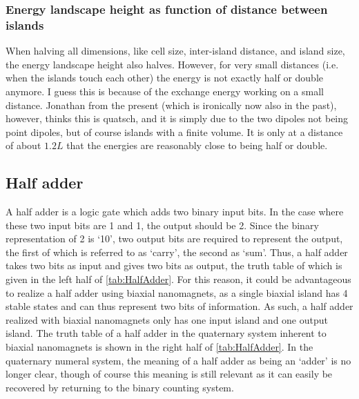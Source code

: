 \documentclass[11pt,a4paper,english]{article}
\begin{document}
\subsubsection{Energy landscape height as function of distance between islands}
\label{par:TwoIslands_EnergyHeight}
When halving all dimensions, like cell size, inter-island distance, and island size, the energy landscape height also halves. However, for very small distances (i.e. when the islands touch each other) the energy is not exactly half or double anymore. I guess this is because of the exchange energy working on a small distance. Jonathan from the present (which is ironically now also in the past), however, thinks this is quatsch, and it is simply due to the two dipoles not being point dipoles, but of course islands with a finite volume. It is only at a distance of about $1.2 L$ that the energies are reasonably close to being half or double.

\subsection{Half adder}
A half adder is a logic gate which adds two binary input bits. In the case where these two input bits are 1 and 1, the output should be 2. Since the binary representation of 2 is `10', two output bits are required to represent the output, the first of which is referred to as `carry', the second as `sum'. Thus, a half adder takes two bits as input and gives two bits as output, the truth table of which is given in the left half of \cref{tab:HalfAdder}. For this reason, it could be advantageous to realize a half adder using biaxial nanomagnets, as a single biaxial island has 4 stable states and can thus represent two bits of information. As such, a half adder realized with biaxial nanomagnets only has one input island and one output island. The truth table of a half adder in the quaternary system inherent to biaxial nanomagnets is shown in the right half of \cref{tab:HalfAdder}. In the quaternary numeral system, the meaning of a half adder as being an `adder' is no longer clear, though of course this meaning is still relevant as it can easily be recovered by returning to the binary counting system.
\end{document}
